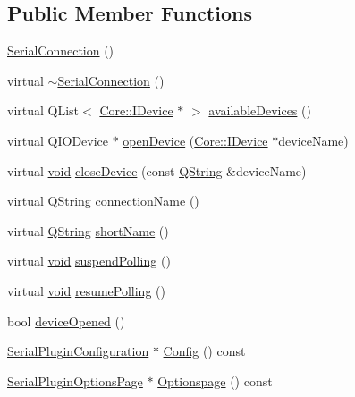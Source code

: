 \subsection*{\-Public \-Member \-Functions}
\begin{DoxyCompactItemize}
\item 
\hyperlink{group___serial_plugin_gaad6479d49b3483b42c19868c9efcef01}{\-Serial\-Connection} ()
\item 
virtual \hyperlink{group___serial_plugin_gae73749bb08c2f53f467809cb6c0a3fc8}{$\sim$\-Serial\-Connection} ()
\item 
virtual \-Q\-List$<$ \hyperlink{class_core_1_1_i_device}{\-Core\-::\-I\-Device} $\ast$ $>$ \hyperlink{group___serial_plugin_ga35f8b088eb3166e3e81cc71809806085}{available\-Devices} ()
\item 
virtual \-Q\-I\-O\-Device $\ast$ \hyperlink{group___serial_plugin_gacbed38aeba722578f369ad9b4ef2b822}{open\-Device} (\hyperlink{class_core_1_1_i_device}{\-Core\-::\-I\-Device} $\ast$device\-Name)
\item 
virtual \hyperlink{group___u_a_v_objects_plugin_ga444cf2ff3f0ecbe028adce838d373f5c}{void} \hyperlink{group___serial_plugin_gaa5933c2426d549fd1621d1e29529e517}{close\-Device} (const \hyperlink{group___u_a_v_objects_plugin_gab9d252f49c333c94a72f97ce3105a32d}{\-Q\-String} \&device\-Name)
\item 
virtual \hyperlink{group___u_a_v_objects_plugin_gab9d252f49c333c94a72f97ce3105a32d}{\-Q\-String} \hyperlink{group___serial_plugin_ga4b91aa098a25069f0590a25687bdf25b}{connection\-Name} ()
\item 
virtual \hyperlink{group___u_a_v_objects_plugin_gab9d252f49c333c94a72f97ce3105a32d}{\-Q\-String} \hyperlink{group___serial_plugin_ga6783c4f6c9faa91aeb0b91fef726a2d4}{short\-Name} ()
\item 
virtual \hyperlink{group___u_a_v_objects_plugin_ga444cf2ff3f0ecbe028adce838d373f5c}{void} \hyperlink{group___serial_plugin_ga9616a4134ceba88c6ae5820e29a783c4}{suspend\-Polling} ()
\item 
virtual \hyperlink{group___u_a_v_objects_plugin_ga444cf2ff3f0ecbe028adce838d373f5c}{void} \hyperlink{group___serial_plugin_gac4a001507836025006728ab1771116f0}{resume\-Polling} ()
\item 
bool \hyperlink{group___serial_plugin_gaa9616a7f264a903a0a5b13ae05d40375}{device\-Opened} ()
\item 
\hyperlink{class_serial_plugin_configuration}{\-Serial\-Plugin\-Configuration} $\ast$ \hyperlink{group___serial_plugin_gad054f24566a90754595ad08e00756bfc}{\-Config} () const 
\item 
\hyperlink{class_serial_plugin_options_page}{\-Serial\-Plugin\-Options\-Page} $\ast$ \hyperlink{group___serial_plugin_gaf86b9d4296b2b9e6429dd643fd113861}{\-Optionspage} () const 
\end{DoxyCompactItemize}
